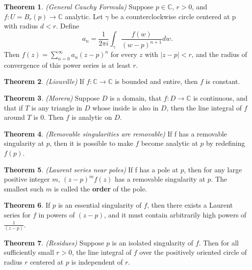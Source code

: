 \documentclass[a4paper]{article}
\theoremstyle{definition}
\newtheorem{theorem}{Theorem}
\begin{document}
	\begin{theorem}
		\emph{(General Cauchy Formula)}
		Suppose $p \in \mathbb{C}$, $r > 0$, and $f : U = B_{r}(p) \rightarrow \mathbb{C}$ analytic. Let $\gamma$ be a counterclockwise circle centered at p with radius $d < r$. Define
		$$a_{n} = \frac{1}{2 \pi i} \int_{\gamma} \frac{f(w)}{(w-p)^{n+1}} dw.$$
		Then $f(z) = \sum_{n=0}^{\infty} a_{n} (z-p)^{n}$ for every $z$ with $|z-p| < r$, and the radius of convergence of this power series is at least $r$.
	\end{theorem}
	
	\begin{theorem}
		\emph{(Liouville)}
		If $f : \mathbb{C} \rightarrow \mathbb{C}$ is bounded and entire, then $f$ is constant.
	\end{theorem}
	
	\begin{theorem}
		\emph{(Morera)}
		Suppose $D$ is a domain, that $f : D \rightarrow \mathbb{C}$ is continuous, and that if $T$ is any triangle in $D$ whose inside is also in $D$, then the line integral of $f$ around $T$ is 0. Then $f$ is analytic on $D$.
	\end{theorem}
	
	\begin{theorem}
		\emph{(Removable singularities are removable)}
		If f has a removable singularity at $p$, then it is possible to make $f$ become analytic at $p$ by redefining $f(p)$.
	\end{theorem}
	
	\begin{theorem}
		\emph{(Laurent series near poles)}
		If f has a pole at $p$, then for any large positive integer $m$, $(z-p)^{m} f(z)$ has a removable singularity at $p$. The smallest such $m$ is called the \textbf{order} of the pole.
	\end{theorem}
	
	\begin{theorem}
		If $p$ is an essential singularity of $f$, then there exists a Laurent series for $f$
		in powers of $(z-p)$, and it must contain arbitrarily high powers of $\frac{1}{(z-p)}$.
	\end{theorem}
	
	\begin{theorem}
		\emph{(Residues)}
		Suppose $p$ is an isolated singularity of $f$. Then for all sufficiently small $r > 0$, the line integral of $f$ over the positively oriented circle of radius $r$ centered at $p$ is independent of $r$. 
	\end{theorem}
	
\end{document}
